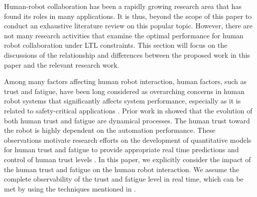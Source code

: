 \documentclass[journal]{IEEEtran}
\begin{document}
Human-robot collaboration has been a rapidly growing research area that has found its roles in many applications\cite{bauer2008human}. It is thus, beyond the scope of this paper to conduct an exhaustive literature review on this popular topic. However, there are not many research activities that examine the optimal performance for human robot collaboration under LTL constraints. This section will focus on the discussions of the relationship and differences between the proposed work in this paper and the relevant research work.

Among many factors affecting human robot interaction, human factors, such as trust and fatigue, have been long considered as overarching concerns in human robot systems that significantly affects system performance, especially as it is related to safety-critical applications \cite{hancock2011meta}. Prior work in \cite{desai2012effects, robinette2015effect} showed that the evolution of both human trust and fatigue are dynamical processes. The human trust toward the robot is highly dependent on the automation performance. %
These observations motivate research efforts on the development of quantitative models for human trust
and fatigue to provide appropriate real time predictions \cite{lee1992trust,desai2013impact} and control of human trust levels \cite{sadrfaridpour2016modeling}. In this paper, we explicitly consider the impact of the human trust and fatigue on the human robot interaction. We assume the complete observability of the trust and fatigue level in real time, which can be met by using the techniques mentioned in \cite{wang2015mutual,Fu-RSS-14}.
\end{document}
